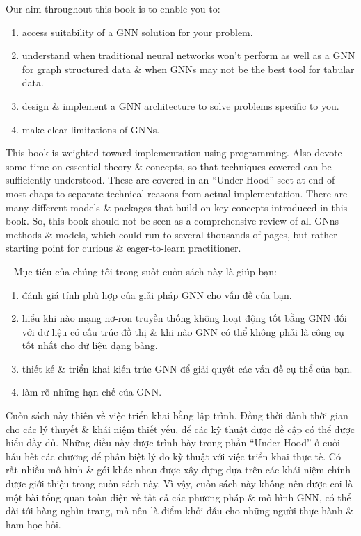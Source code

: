 \documentclass{article}
\begin{document}
\begin{itemize}
\begin{itemize}
        Our aim throughout this book is to enable you to:
        \begin{enumerate}
            \item access suitability of a GNN solution for your problem.
            \item understand when traditional neural networks won't perform as well as a GNN for graph structured data \& when GNNs may not be the best tool for tabular data.
            \item design \& implement a GNN architecture to solve problems specific to you.
            \item make clear limitations of GNNs.
        \end{enumerate}
        This book is weighted toward implementation using programming. Also devote some time on essential theory \& concepts, so that techniques covered can be sufficiently understood. These are covered in an ``Under Hood'' sect at end of most chaps to separate technical reasons from actual implementation. There are many different models \& packages that build on key concepts introduced in this book. So, this book should not be seen as a comprehensive review of all GNns methods \& models, which could run to several thousands of pages, but rather starting point for curious \& eager-to-learn practitioner.

        -- Mục tiêu của chúng tôi trong suốt cuốn sách này là giúp bạn:
        \begin{enumerate}
            \item đánh giá tính phù hợp của giải pháp GNN cho vấn đề của bạn.
            \item hiểu khi nào mạng nơ-ron truyền thống không hoạt động tốt bằng GNN đối với dữ liệu có cấu trúc đồ thị \& khi nào GNN có thể không phải là công cụ tốt nhất cho dữ liệu dạng bảng.
            \item thiết kế \& triển khai kiến trúc GNN để giải quyết các vấn đề cụ thể của bạn.
            \item làm rõ những hạn chế của GNN.
        \end{enumerate}
        Cuốn sách này thiên về việc triển khai bằng lập trình. Đồng thời dành thời gian cho các lý thuyết \& khái niệm thiết yếu, để các kỹ thuật được đề cập có thể được hiểu đầy đủ. Những điều này được trình bày trong phần ``Under Hood'' ở cuối hầu hết các chương để phân biệt lý do kỹ thuật với việc triển khai thực tế. Có rất nhiều mô hình \& gói khác nhau được xây dựng dựa trên các khái niệm chính được giới thiệu trong cuốn sách này. Vì vậy, cuốn sách này không nên được coi là một bài tổng quan toàn diện về tất cả các phương pháp \& mô hình GNN, có thể dài tới hàng nghìn trang, mà nên là điểm khởi đầu cho những người thực hành \& ham học hỏi.


\end{itemize}
\end{itemize}
\end{document}

